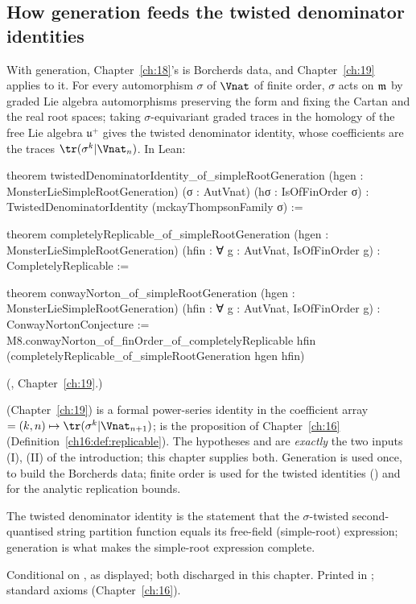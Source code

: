 \subsection{How generation feeds the twisted denominator identities}

With generation, Chapter~\ref{ch:18}'s  is Borcherds data, and
Chapter~\ref{ch:19} applies to it.  For every automorphism $\sigma$ of $\Vnat$ of finite order, $\sigma$ acts on $\mathfrak m$
by graded Lie algebra automorphisms preserving the form and fixing the Cartan and the real root spaces; taking
$\sigma$-equivariant graded traces in the homology of the free Lie algebra $\mathfrak u^+$ gives the twisted denominator
identity, whose coefficients are the traces $\tr(\sigma^k|\Vnat_n)$.  In Lean:
\begin{leancode}
theorem twistedDenominatorIdentity_of_simpleRootGeneration (hgen : MonsterLieSimpleRootGeneration)
    (σ : AutVnat) (hσ : IsOfFinOrder σ) : TwistedDenominatorIdentity (mckayThompsonFamily σ) :=

theorem completelyReplicable_of_simpleRootGeneration (hgen : MonsterLieSimpleRootGeneration)
    (hfin : ∀ g : AutVnat, IsOfFinOrder g) : CompletelyReplicable :=

theorem conwayNorton_of_simpleRootGeneration (hgen : MonsterLieSimpleRootGeneration)
    (hfin : ∀ g : AutVnat, IsOfFinOrder g) : ConwayNortonConjecture :=
  M8.conwayNorton_of_finOrder_of_completelyReplicable hfin
    (completelyReplicable_of_simpleRootGeneration hgen hfin)
\end{leancode}
(, Chapter~\ref{ch:19}.)
\begin{dictionary}
 (Chapter~\ref{ch:19}) is a formal power-series identity in the coefficient array
 $=(k,n)\mapsto\tr(\sigma^k|\Vnat_{n+1})$;  is the proposition of
Chapter~\ref{ch:16} (Definition~\ref{ch16:def:replicable}).  The hypotheses  and  are \emph{exactly} the two
inputs (I), (II) of the introduction; this chapter supplies both.  Generation is used once, to build the Borcherds data;
finite order is used for the twisted identities () and for the analytic replication bounds.
\end{dictionary}
\begin{physics}
The twisted denominator identity is the statement that the $\sigma$-twisted second-quantised string partition function
equals its free-field (simple-root) expression; generation is what makes the simple-root expression complete.
\end{physics}
\begin{status}
Conditional on ,  as displayed; both discharged in this chapter.  Printed in
; standard axioms (Chapter~\ref{ch:16}).
\end{status}

